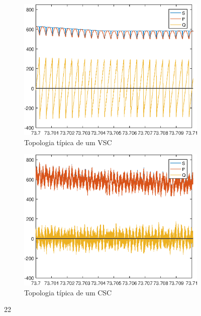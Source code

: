 \begin{figure}[!htb] %
	\centering
	\begin{subfigure}[b]{0.48\textwidth}
		\centering
		\includegraphics[width=\textwidth]{Cap4/Figuras/resultados_unfilt_22.eps}
		\caption{Topologia típica de um VSC} 
		\label{fig:resultados_unfilt_22.eps}
	\end{subfigure}%
		\hfill
	\begin{subfigure}[b]{0.48\textwidth}  
		\centering 
		\includegraphics[width=\textwidth]{Cap4/Figuras/resultados_filt_22.eps}
		\caption{Topologia típica de um CSC}    
		\label{fig:resultados_filt_22.eps}
	\end{subfigure}%
	\caption{22}
	\label{fig:22}
\end{figure}

